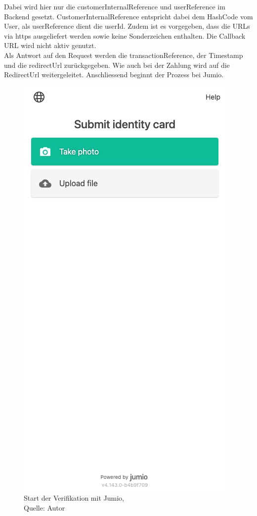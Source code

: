 Dabei wird hier nur die customerInternalReference und userReference im Backend gesetzt. CustomerInternalReference entspricht dabei dem HashCode vom User, als userReference dient die userId. Zudem ist es vorgegeben, dass die URLs via https ausgeliefert werden sowie keine Sonderzeichen enthalten. Die Callback URL wird nicht aktiv genutzt. \\

Als Antwort auf den Request werden die transactionReference, der Timestamp und die redirectUrl zurückgegeben. Wie auch bei der Zahlung wird auf die RedirectUrl weitergeleitet. Anschliessend beginnt der Prozess bei Jumio.
 \begin{figure}[H]
	\centering
	\includegraphics[scale=0.3]{images/jumioStartPage.PNG}
	\caption[Start der Verifikation mit Jumio]{Start der Verifikation mit Jumio,\\ Quelle: Autor}
	\label{img: jumioStartPage}
\end{figure} 

